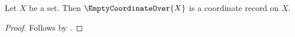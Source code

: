 

\begin{classification}\label{empty_coordinate_own_parameter}
    Let $X$ be a set.
    Then $\EmptyCoordinateOver{X}$ is a coordinate record on $X$.
\end{classification}
\begin{proof}
    Follows by .
\end{proof}
